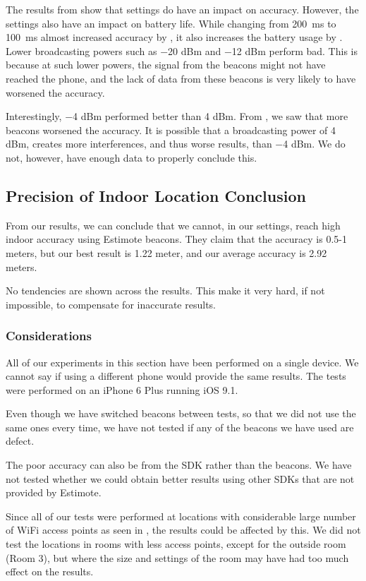 The results from  show that settings do have an impact on accuracy. However, the settings also have an impact on battery life. 
While changing from \SI{200}{\milli\second} to \SI{100}{\milli\second} almost increased accuracy by ,
it also increases the battery usage by .
Lower broadcasting powers such as \num{-20} dBm and \num{-12} dBm perform bad. 
This is because at such lower powers, 
the signal from the beacons might not have reached the phone, 
and the lack of data from these beacons is very likely to have worsened the accuracy.

Interestingly, \num{-4} dBm performed better than \num{4} dBm.
From , we saw that more beacons worsened the accuracy. 
It is possible that a broadcasting power of \num{4} dBm,
creates more interferences, and thus worse results, than \num{-4} dBm. 
We do not, however, have enough data to properly conclude this. 

\subsection{Precision of Indoor Location Conclusion}
From our results, we can conclude that we cannot, 
in our settings, reach high indoor accuracy using Estimote beacons. 
They claim that the accuracy is \num{0.5}-\num{1} meters, 
but our best result is \num{1.22} meter, 
and our average accuracy is \num{2.92} meters. 

No tendencies are shown across the results. 
This make it very hard, if not impossible,
to compensate for inaccurate results.  

\subsubsection{Considerations}
All of our experiments in this section have been performed on a single device.
We cannot say if using a different phone would provide the same results.
The tests were performed on an iPhone 6 Plus running iOS 9.1.

Even though we have switched beacons between tests, 
so that we did not use the same ones every time, 
we have not tested if any of the beacons we have used are defect. 

The poor accuracy can also be from the SDK rather than the beacons. 
We have not tested whether we could obtain better results using other SDKs that are not provided by Estimote. 

Since all of our tests were performed at locations with considerable large number of WiFi access points as seen in ,
the results could be affected by this. 
We did not test the locations in rooms with less access points, 
except for the outside room (Room 3), 
but where the size and settings of the room may have had too much effect on the results.